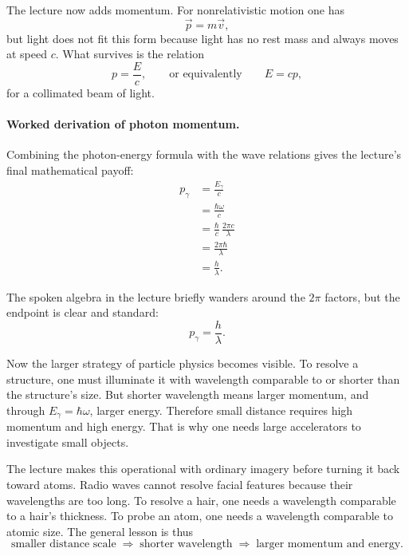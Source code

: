 The lecture now adds momentum. For nonrelativistic motion one has
\begin{equation}
\vec p = m\vec v,
\end{equation}
but light does not fit this form because light has no rest mass and always moves at speed \(c\). What survives is the relation
\begin{equation}
p = \frac{E}{c},
\qquad\text{or equivalently}\qquad
E=cp,
\end{equation}
for a collimated beam of light.

\paragraph{Worked derivation of photon momentum.}
Combining the photon-energy formula with the wave relations gives the lecture's final mathematical payoff:
\begin{align}
p_\gamma &= \frac{E_\gamma}{c} \\
&= \frac{\hbar\omega}{c} \\
&= \frac{\hbar}{c}\,\frac{2\pi c}{\lambda} \\
&= \frac{2\pi\hbar}{\lambda} \\
&= \frac{h}{\lambda}.
\end{align}

The spoken algebra in the lecture briefly wanders around the \(2\pi\) factors, but the endpoint is clear and standard:
\begin{equation}
p_\gamma = \frac{h}{\lambda}.
\end{equation}

Now the larger strategy of particle physics becomes visible. To resolve a structure, one must illuminate it with wavelength comparable to or shorter than the structure's size. But shorter wavelength means larger momentum, and through \(E_\gamma=\hbar\omega\), larger energy. Therefore small distance requires high momentum and high energy. That is why one needs large accelerators to investigate small objects.

The lecture makes this operational with ordinary imagery before turning it back toward atoms. Radio waves cannot resolve facial features because their wavelengths are too long. To resolve a hair, one needs a wavelength comparable to a hair's thickness. To probe an atom, one needs a wavelength comparable to atomic size. The general lesson is thus
\begin{equation}
\text{smaller distance scale}
\;\Longrightarrow\;
\text{shorter wavelength}
\;\Longrightarrow\;
\text{larger momentum and energy}.
\end{equation}

